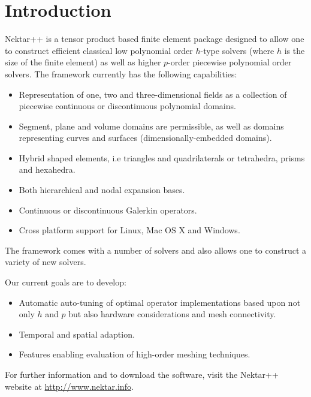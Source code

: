 \chapter{Introduction}
Nektar++ \cite{CaMoCoBoRo15} is a tensor product based finite element package
designed to allow one to construct efficient classical low polynomial order
$h$-type solvers (where $h$ is the size of the finite element) as well as higher
$p$-order piecewise polynomial order solvers.  The framework currently has the
following capabilities:

\begin{itemize}
\item Representation of one, two and three-dimensional fields as a collection of
 piecewise continuous or discontinuous polynomial domains.
\item Segment, plane and volume domains are permissible, as well as domains
 representing curves and surfaces (dimensionally-embedded domains).
\item Hybrid shaped elements, i.e triangles and quadrilaterals or tetrahedra,
prisms and hexahedra.
\item Both hierarchical and nodal expansion bases.
\item Continuous or discontinuous Galerkin operators.
\item Cross platform support for Linux, Mac OS X and Windows.
\end{itemize}

The framework comes with a number of solvers and also allows one to construct a
variety of new solvers.

Our current goals are to develop:
\begin{itemize}
\item Automatic auto-tuning of optimal operator implementations based upon not
only $h$ and $p$ but also hardware considerations and mesh connectivity.
\item Temporal and spatial adaption.
\item Features enabling evaluation of high-order meshing techniques.
\end{itemize}

For further information and to download the software, visit the Nektar++ website
at \url{http://www.nektar.info}.
